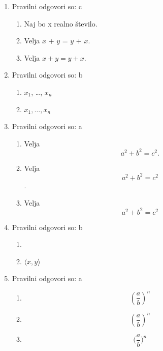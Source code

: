 \documentclass[11pt]{article}
\begin{document}
\begin{enumerate}
    \item Pravilni odgovori so: c%
    \begin{enumerate}
        \item Naj bo x realno število.
        \item Velja \(x\) + \(y\) = \(y\) + \(x\).
        \item Velja \(x + y = y + x\).
    \end{enumerate}

    \item Pravilni odgovori so: b%
    \begin{enumerate}
        \item \(x_1\), \dots, \(x_n\)
        \item \(x_1, \ldots, x_n\)
    \end{enumerate}

    \item Pravilni odgovori so: a%
    \begin{enumerate}
        \item
Velja
\[
  a^2 + b^2 = c^2.
\]
        \item
Velja
\[
  a^2 + b^2 = c^2
\]
.
        \item
Velja
\[
  a^2 + b^2 = c^2
\]
    \end{enumerate}

    \item Pravilni odgovori so: b%
    \begin{enumerate}
        \item \(<x, y>\)
        \item \(\langle x, y \rangle\)
    \end{enumerate}

    \item Pravilni odgovori so: a%
    \begin{enumerate}
        \item \[ (\frac{a}{b})^n \]
        \item \[ \left(\frac{a}{b}\right)^n \]
        \item \[ \Big(\frac{a}{b}\Big)^n \]
    \end{enumerate}


\end{enumerate}
\end{document}
